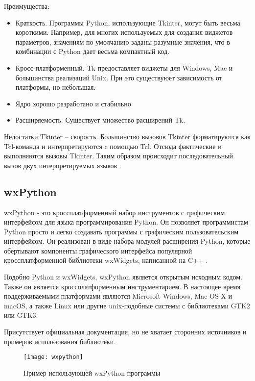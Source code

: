 \documentclass[14pt]{extreport}
\begin{document}
Преимущества:
\begin{itemize}
	\item	 Краткость. Программы Python, использующие Tkinter, могут быть весьма короткими. Например, для многих используемых для создания виджетов параметров, значениям по умолчанию заданы разумные значения, что в комбинации с Python дает весьма компактный код.
	
	\item Кросс-платформенный. Tk предоставляет виджеты для Windows, Mac и большинства реализаций Unix. При это существуюет зависимость от платформы, но небольшая.
	
	\item Ядро хорошо разработано и стабильно
	
	\item Расширяемость. Существует множество расширений Tk.

\end{itemize}

Недостатки Tkinter -- скорость. Большинство вызовов Tkinter форматируются как Tcl-команда и интерпретируются c помощью Tcl. Отсюда фактические и выполняются вызовы Tkinter. Таким образом происходит последовательный вызов двух интерпретируемых языков \cite{pythonRob}.

\subsection{wxPython}
wxPython - это кроссплатформенный набор инструментов с графическим интерфейсом для языка программирования Python. Он позволяет программистам Python просто и легко создавать программы с графическим пользовательским интерфейсом. Он реализован в виде набора модулей расширения Python, которые обертывают компоненты графического интерфейса популярной кроссплатформенной библиотеки wxWidgets, написанной на C++ \cite{wxpython}.

Подобно Python и wxWidgets, wxPython является открытым исходным кодом. Также он является кроссплатформенным инструментарием. В настоящее время поддерживаемыми платформами являются Microsoft Windows, Mac OS X и macOS, а также Linux или другие unix-подобные системы с библиотеками GTK2 или GTK3.

Присутствует официальная документация, но не хватает сторонних источников и примеров использования библиотеки.

\begin{figure}[H]
	\centerline{\texttt{[image: wxpython]}}
	\caption{Пример использующей wxPython программы}
	\label{figwxpython}
\end{figure}
\end{document}
